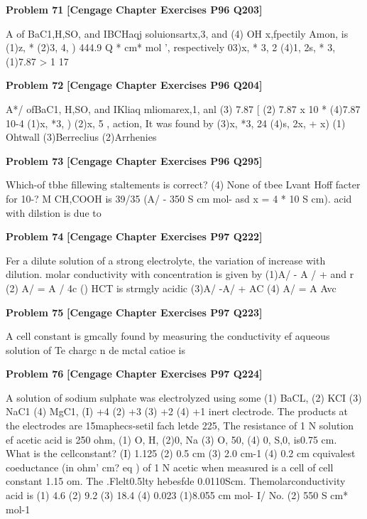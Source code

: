 \begin{problembox}
\textbf{Problem 71} \hfill \textbf{[Cengage Chapter Exercises P96 Q203]}
\label{q:ext-cng-th-71}

A of BaC1,H,SO, and IBCHaqj soluionsartx,3, and
(4) OH
x,fpectily Amon, is
(1)z, * 
(2)3,  4,  )
444.9 Q * cm* mol ', respectively
03)x, * 3,  2
(4)1, 
2s, * 3,
(1)7.87 > 1 17
\end{problembox}

\begin{problembox}
\textbf{Problem 72} \hfill \textbf{[Cengage Chapter Exercises P96 Q204]}
\label{q:ext-cng-th-72}

A*/ ofBaC1, H,SO, and IKliaq mliomarex,1, anl
(3) 7.87   [ 
(2) 7.87 x 10 *
(4)7.87   10-4
(1)x, *3, )
(2)x, 5  ,
action, It was found by
(3)x, *3, 24
(4)s, 2x, + x)
(1) Ohtwall
(3)Berreclius
(2)Arrhenies
\end{problembox}

\begin{problembox}
\textbf{Problem 73} \hfill \textbf{[Cengage Chapter Exercises P96 Q295]}
\label{q:ext-cng-th-73}

Which-of tbhe fillewing staltements is  correct?
(4) None of tbee
Lvant Hoff facter for 10-? M CH,COOH is 39/35
(A/  - 350 S cm  mol- asd x = 4 * 10  S cm).
acid with dilstion is due to
\end{problembox}

\begin{problembox}
\textbf{Problem 74} \hfill \textbf{[Cengage Chapter Exercises P97 Q222]}
\label{q:ext-cng-th-74}

Fer a dilute solution of a strong electrolyte, the variation of
increase with dilution.
molar conductivity with concentration is given by
(1)A/  - A /  + and r
(2) A/  = A /   4c
() HCT is strmgly acidic
(3)A/ -A/  + AC
(4) A/  = A 
Avc
\end{problembox}

\begin{problembox}
\textbf{Problem 75} \hfill \textbf{[Cengage Chapter Exercises P97 Q223]}
\label{q:ext-cng-th-75}

A cell constant is gmcally found by measuring the
conductivity ef aqueous solution of
Te chargc n de mctal catioe is
\end{problembox}

\begin{problembox}
\textbf{Problem 76} \hfill \textbf{[Cengage Chapter Exercises P97 Q224]}
\label{q:ext-cng-th-76}

A solution of sodium sulphate was electrolyzed using some
(1) BaCL,
(2) KCI
(3) NaC1
(4) MgC1,
(I) +4
(2) +3
(3) +2
(4) +1
inert clectrode. The products at the electrodes are
15maphecs-setil fach letde
225, The resistance of 1 N solution ef acetic acid is 250 ohm,
(1) O, H,
(2)0, Na (3) O, 50,
(4) 0, S,0,
is0.75 cm. What is the cellconstant?
(I) 1.125
(2) 0.5 cm
(3) 2.0 cm-1
(4) 0.2 cm
cquivalest coeductance (in ohm' cm? eq  ) of 1 N acetic
when measured is a cell of cell constant 1.15 om. The
.Flelt0.5lty
hebesfde 0.0110Scm. Themolarconductivity
acid is
(1) 4.6
(2) 9.2
(3) 18.4
(4) 0.023
(1)8.055  cm mol-
I/ No. 
(2) 550 S cm* mol-1
\end{problembox}

